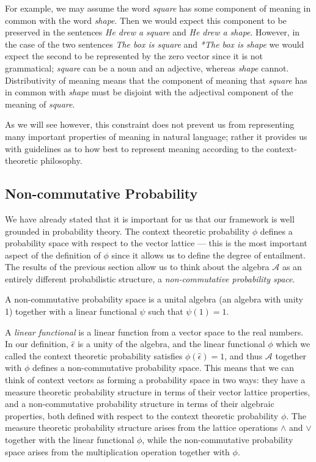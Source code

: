 For example, we may assume the word \emph{square} has some component of meaning in common with the word \emph{shape}. Then we would expect this component to be preserved in the sentences \emph{He drew a square} and \emph{He drew a shape}. However, in the case of the two sentences \emph{The box is square} and \emph{*The box is shape} we would expect the second to be represented by the zero vector since it is not grammatical; \emph{square} can be a noun and an adjective, whereas \emph{shape} cannot. Distributivity of meaning means that the component of meaning that \emph{square} has in common with \emph{shape} must be disjoint with the adjectival component of the meaning of \emph{square}.

As we will see however, this constraint does not prevent us from representing many important properties of meaning in natural language; rather it provides us with guidelines as to how best to represent meaning according to the context-theoretic philosophy.

\subsection{Non-commutative Probability}

We have already stated that it is important for us that our framework is well grounded in probability theory. The context theoretic probability $\phi$ defines a probability space with respect to the vector lattice --- this is the most important aspect of the definition of $\phi$ since it allows us to define the degree of entailment. The results of the previous section allow us to think about the algebra $\mathcal{A}$ as an entirely different probabilistic structure, a \emph{non-commutative probability space}.
\begin{defn}
A non-commutative probability space is a unital algebra (an algebra with unity 1) together with a linear functional $\psi$ such that $\psi(1) = 1$.
\end{defn}
A \emph{linear functional} is a linear function from a vector space to the real numbers. In our definition, $\hat{\epsilon}$ is a unity of the algebra, and the linear functional $\phi$ which we called the context theoretic probability satisfies $\phi(\hat{\epsilon}) = 1$, and thus $\mathcal{A}$ together with $\phi$ defines a non-commutative probability space. This means that we can think of context vectors as forming a probability space in two ways: they have a measure theoretic probability structure in terms of their vector lattice properties, and a non-commutative probability structure in terms of their algebraic properties, both defined with respect to the context theoretic probability $\phi$. The measure theoretic probability structure arises from the lattice operations $\land$ and $\lor$ together with the linear functional $\phi$, while the non-commutative probability space arises from the multiplication operation together with $\phi$.

